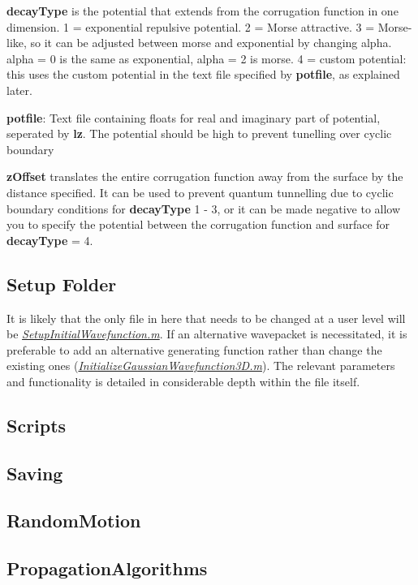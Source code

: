 \documentclass[11pt,letterpaper]{article}
\renewcommand{\\}{\bigskip}
\begin{document}
\textbf{decayType} is the potential that extends from the corrugation function in one dimension. 1 = exponential repulsive potential. 2 = Morse attractive. 3 = Morse-like, so it can be adjusted between morse and exponential by changing alpha. alpha = 0 is the same as exponential, alpha = 2 is morse. 4 = custom potential: this uses the custom potential in the text file specified by \textbf{potfile}, as explained later.\\

    
\textbf{potfile}: Text file containing floats for real and imaginary part of potential, seperated by \textbf{lz}. The potential should be high to prevent tunelling over cyclic boundary\\

\textbf{zOffset} translates the entire corrugation function away from the surface by the distance specified. It can be used to prevent quantum tunnelling due to cyclic boundary conditions for \textbf{decayType} 1 - 3, or it can be made negative to allow you to specify the potential between the corrugation function and surface for
\textbf{decayType} = 4.\\

\subsection{Setup Folder}

It is likely that the only file in here that needs to be changed at a user level will be \textit{\ul{SetupInitialWavefunction.m}}. If an alternative wavepacket is necessitated, it is preferable to add an alternative generating function rather than change the existing ones (\textit{\ul{InitializeGaussianWavefunction3D.m}}). The relevant parameters and functionality is detailed in considerable depth within the file itself.

\subsection{Scripts}

\subsection{Saving}

\subsection{RandomMotion}

\subsection{PropagationAlgorithms}
\end{document}
